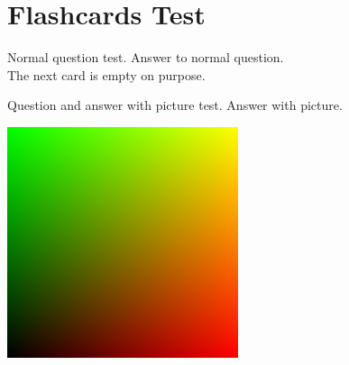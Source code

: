 \documentclass{../flashcards}
\begin{document}
\section{Flashcards Test}

\begin{card}{Normal question test.}
Answer to normal question.\\
The next card is empty on purpose.
\end{card}

\begin{card}{}

\end{card}

{Question and answer with picture test.}
Answer with picture.\\[0.5cm]
\begin{center}
\includegraphics[scale=0.5]{gradient.png}
\end{center}
\end{card}
\end{document}
